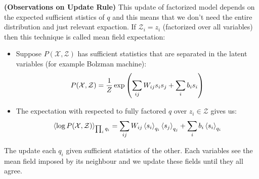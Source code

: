 \begin{remark}{\textbf{(Observations on Update Rule)}}
    This update of factorized model depends on the expected sufficient stistics of $q$ and this means that we don't need the entire distribution and just relevant expaction. If $\mathcal{Z}_i = z_i$ (factorized over all variables) then this technique is called mean field expectation:
    \begin{itemize}
        \item Suppose $P(\mathcal{X},\mathcal{Z})$ has sufficient statistics that are separated in the latent variables (for example Bolzman machine):
        \begin{equation*}
            P(\mathcal{X}, \mathcal{Z}) = \frac{1}{Z}\exp\left( \sum_{ij}W_{ij}s_is_j + \sum_ib_is_i \right)
        \end{equation*}
        \item The expectation with respected to fully factored $q$ over $z_i \in \mathcal{Z}$ gives us:
        \begin{equation*}
            \left\langle \log P(\mathcal{X}, \mathcal{Z}) \right\rangle_{\prod_i q_i} = \sum_{ij}W_{ij}\left\langle s_i \right\rangle_{q_i}\left\langle s_j \right\rangle_{q_j} +  \sum_{i}b_i\left\langle s_i \right\rangle_{q_i}
        \end{equation*}
    \end{itemize}
    The update each $q_i$ given sufficient statistics of the other. Each variables see the mean field imposed by its neighbour and we update these fields until they all agree.
\end{remark}

